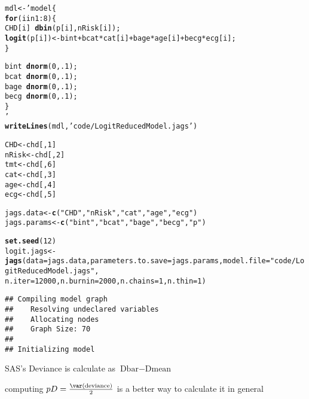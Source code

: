 \documentclass[12pt,letterpaper,oneside]{article}\usepackage{graphicx, color}
\makeatletter
\newcommand{\hlfunctioncall}[1]{\textcolor[rgb]{0.501960784313725,0,0.329411764705882}{\textbf{#1}}}%
\newcommand{\hlstring}[1]{\textcolor[rgb]{0.6,0.6,1}{#1}}%
\newenvironment{kframe}{%
 \def\at@end@of@kframe{}%
 \ifinner\ifhmode%
  \def\at@end@of@kframe{\end{minipage}}%
  \begin{minipage}{\columnwidth}%
 \fi\fi%
 \def\FrameCommand##1{\hskip\@totalleftmargin \hskip-\fboxsep
 \colorbox{shadecolor}{##1}\hskip-\fboxsep
     \hskip-\linewidth \hskip-\@totalleftmargin \hskip\columnwidth}%
 \MakeFramed {\advance\hsize-\width
   \@totalleftmargin\z@ \linewidth\hsize
   \@setminipage}}%
 {\par\unskip\endMakeFramed%
 \at@end@of@kframe}
\newenvironment{knitrout}{}{} %
\makeatother
\begin{document}
\begin{knitrout}\scriptsize
{}\color{fgcolor}\begin{kframe}
\begin{alltt}
mdl <- ' model \{
    \hlfunctioncall{for} (i in 1:8) \{
        CHD[i] ~ \hlfunctioncall{dbin}(p[i], nRisk[i]);
            \hlfunctioncall{logit}(p[i]) <- bint + bcat*cat[i] + bage*age[i] + becg*ecg[i];
    \}
    
    bint ~ \hlfunctioncall{dnorm}(0, .1);
    bcat ~ \hlfunctioncall{dnorm}(0, .1);
    bage ~ \hlfunctioncall{dnorm}(0, .1);
    becg ~ \hlfunctioncall{dnorm}(0, .1);
\}
'
\hlfunctioncall{writeLines}(mdl,\hlstring{'code/LogitReducedModel.jags'})
\end{alltt}
\end{kframe}
\end{knitrout}

\begin{knitrout}\scriptsize
{}\color{fgcolor}\begin{kframe}
\begin{alltt}
CHD <- chd[, 1]
nRisk <- chd[, 2]
tmt <- chd[, 6]
cat <- chd[, 3]
age <- chd[, 4]
ecg <- chd[, 5]

jags.data <- \hlfunctioncall{c}(\hlstring{"CHD"}, \hlstring{"nRisk"}, \hlstring{"cat"}, \hlstring{"age"}, \hlstring{"ecg"})
jags.params <- \hlfunctioncall{c}(\hlstring{"bint"}, \hlstring{"bcat"}, \hlstring{"bage"}, \hlstring{"becg"}, \hlstring{"p"})

\hlfunctioncall{set.seed}(12)
logit.jags <- \hlfunctioncall{jags}(data = jags.data, parameters.to.save = jags.params, model.file = \hlstring{"code/LogitReducedModel.jags"}, 
    n.iter = 12000, n.burnin = 2000, n.chains = 1, n.thin = 1)
\end{alltt}
\begin{verbatim}
## Compiling model graph
##    Resolving undeclared variables
##    Allocating nodes
##    Graph Size: 70
## 
## Initializing model
\end{verbatim}
\end{kframe}
\end{knitrout}

SAS's Deviance is calculate as $\text{Dbar}-\text{Dmean}$

computing $pD=\frac{\var(\text{deviance})}{2}$ is a better way to calculate it in general
\end{document}
